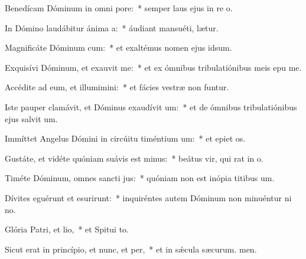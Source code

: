 \item Benedícam Dóminum in omni pore:~* semper laus ejus in re o.
\item In Dómino laudábitur ánima a:~* áudiant mansuéti,  lætur.
\item Magnificáte Dóminum cum:~* et exaltémus nomen ejus  idsum.
\item Exquisívi Dóminum, et exauvit me:~* et ex ómnibus tribulatiónibus meis epu me.
\item Accédite ad eum, et illumimini:~* et fácies vestræ non funtur.
\item Iste pauper clamávit, et Dóminus exaudívit um:~* et de ómnibus tribulatiónibus ejus salvit um.
\item Immíttet Angelus Dómini in circúitu timéntium um:~* et epiet os.
\item Gustáte, et vidéte quóniam suávis est minus:~* beátus vir, qui rat in o.
\item Timéte Dóminum, omnes sancti jus:~* quóniam non est inópia titibus um.
\item Dívites eguérunt et esurirunt:~* inquiréntes autem Dóminum non minuéntur ni no.
\item Glória Patri, et lio,~* et Spitui to.
\item Sicut erat in princípio, et nunc, et per,~* et in sǽcula sæcurum. men.
